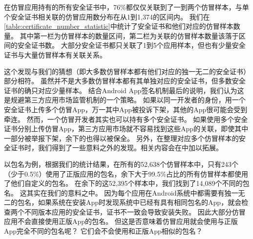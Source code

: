 在仿冒应用持有的所有安全证书中，76\%都仅仅关联到了一到两个仿冒样本，与单个安全证书相关联的仿冒应用数分布在从1到1,374的区间内。
我们在\autoref{table:certificate_number_statistic}中统计了安全证书和他们对应的仿冒样本数量。
其中第一栏为仿冒样本的数量区间，第二栏为关联的仿冒样本数量该落于区间的安全证书数。
大部分安全证书都只关联了1到5个应用样本，但也有少量安全证书与大量仿冒样本有关联关系。

这个发现与我们的猜想（即大多数仿冒样本都有他们对应的独一无二的安全证书）部分相符。
虽然并不是大多数仿冒样本都有其单独对应的安全证书，但多数安全证书的确只对应少量样本。
结合Android App签名机制最后的说明，我们认为这是规避第三方应用市场监管机制的一个策略。
如果以同一开发者的身份，用一个安全证书上传多个仿冒App，万一其中App被投诉下架，其他的App很可能会受到牵连。
然而，一个仿冒开发者其实也可以持有多个安全证书。
如果使用多个安全证书分别上传仿冒App，第三方应用市场就不容易找到这些App的关联，即使其中一部分被举报下架，余下的也得以被保全。
另外，在整理对应多个仿冒样本的安全证书时，我们得到了一些意料之外的发现。相关内容会在中加以拓展。

以包名为例，根据我们的统计结果，在所有的52,638个仿冒样本中，只有243个（少于0.5\%）使用了正版应用的包名，余下大于99.5\%占比的所有仿冒样本都使用了他们自定义的包名。
在余下的这52,395个样本中，我们找到了14,089个不同的包名。
这其实在我们的意料之中。
因为每个应用在Android系统中都需要有独一无二的包名，如果系统在安装App时发现系统中已经有具有相同包名的App，就会检查两个不同版本应用的安全证书，证书不一致会导致安装失败。
因此大部分仿冒应用不会直接使用正版App的包名。
但这是否意味着仿冒应用就会使用与正版App完全不同的包名呢？
它们会不会使用和正版App相似的包名？


